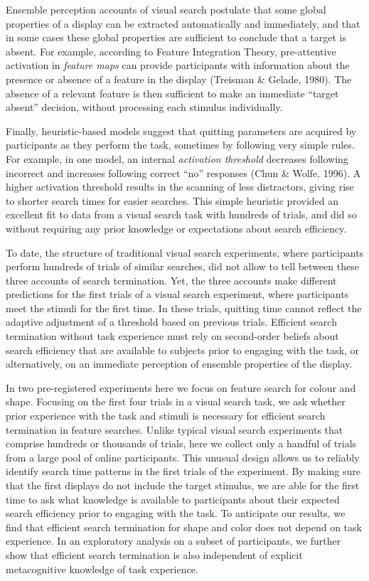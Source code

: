 \documentclass[
  english,
  man]{apa6}
\begin{document}
Ensemble perception accounts of visual search postulate that some global properties of a display can be extracted automatically and immediately, and that in some cases these global properties are sufficient to conclude that a target is absent. For example, according to Feature Integration Theory, pre-attentive activation in \emph{feature maps} can provide participants with information about the presence or absence of a feature in the display (Treisman \& Gelade, 1980). The absence of a relevant feature is then sufficient to make an immediate \enquote{target absent} decision, without processing each stimulus individually.

Finally, heuristic-based models suggest that quitting parameters are acquired by participants as they perform the task, sometimes by following very simple rules. For example, in one model, an internal \emph{activation threshold} decreases following incorrect and increases following correct \enquote{no} responses (Chun \& Wolfe, 1996). A higher activation threshold results in the scanning of less distractors, giving rise to shorter search times for easier searches. This simple heuristic provided an excellent fit to data from a visual search task with hundreds of trials, and did so without requiring any prior knowledge or expectations about search efficiency.

To date, the structure of traditional visual search experiments, where participants perform hundreds of trials of similar searches, did not allow to tell between these three accounts of search termination. Yet, the three accounts make different predictions for the first trials of a visual search experiment, where participants meet the stimuli for the first time. In these trials, quitting time cannot reflect the adaptive adjustment of a threshold based on previous trials. Efficient search termination without task experience must rely on second-order beliefs about search efficiency that are available to subjects prior to engaging with the task, or alternatively, on an immediate perception of ensemble properties of the display.

In two pre-registered experiments here we focus on feature search for colour and shape. Focusing on the first four trials in a visual search task, we ask whether prior experience with the task and stimuli is necessary for efficient search termination in feature searches. Unlike typical visual search experiments that comprise hundreds or thousands of trials, here we collect only a handful of trials from a large pool of online participants. This unusual design allows us to reliably identify search time patterns in the first trials of the experiment. By making sure that the first displays do not include the target stimulus, we are able for the first time to ask what knowledge is available to participants about their expected search efficiency prior to engaging with the task. To anticipate our results, we find that efficient search termination for shape and color does not depend on task experience. In an exploratory analysis on a subset of participants, we further show that efficient search termination is also independent of explicit metacognitive knowledge of task experience.
\end{document}
